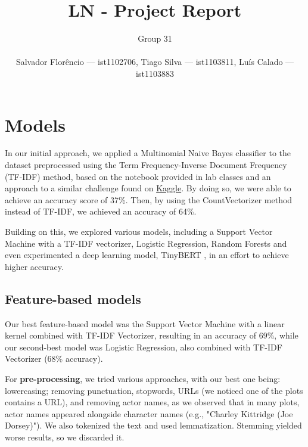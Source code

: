 \documentclass[twocolumn]{article}
\title{LN - Project Report}
\author{
    Group 31 \\[1ex] %
    \\
    Salvador Florêncio — ist1102706, Tiago Silva — ist1103811, Luís Calado — ist1103883 \\
}
\date{}
\begin{document}
\maketitle

\section{Models}
In our initial approach, we applied a Multinomial Naive Bayes classifier to the dataset preprocessed using the Term Frequency-Inverse Document Frequency (TF-IDF) method, based on the notebook provided in lab classes and an approach to a similar challenge found on \href{https://www.kaggle.com/code/imgowthamg/movie-genre-classification}{Kaggle}. By doing so, we were able to achieve an accuracy score of 37\%. Then, by using the CountVectorizer method instead of TF-IDF, we achieved an accuracy of 64\%. 


Building on this, we explored various models, including a Support Vector Machine with a TF-IDF vectorizer, Logistic Regression, Random Forests and even experimented a deep learning model, TinyBERT \cite{tinybert}, in an effort to achieve higher accuracy. 
\vspace{-0.6 cm}
\subsection*{Feature-based models}
\vspace{-0.2 cm}
Our best feature-based model was the Support Vector Machine with a linear kernel combined with TF-IDF Vectorizer, resulting in an accuracy of 69\%, while our second-best model was Logistic Regression, also combined with TF-IDF Vectorizer (68\% accuracy).

For \textbf{pre-processing}, we tried various approaches, with our best one being: lowercasing; removing punctuation, stopwords, URLs (we noticed one of the plots contains a URL), and removing actor names, as we observed that in many plots, actor names appeared alongside character names (e.g., "Charley Kittridge (Joe Dorsey)"). \hspace{-0.1cm}We also tokenized the text and used lemmatization. \hspace{-0.08cm}Stemming yielded worse results, so we discarded it.
\vspace{-0.6 cm}
\end{document}
